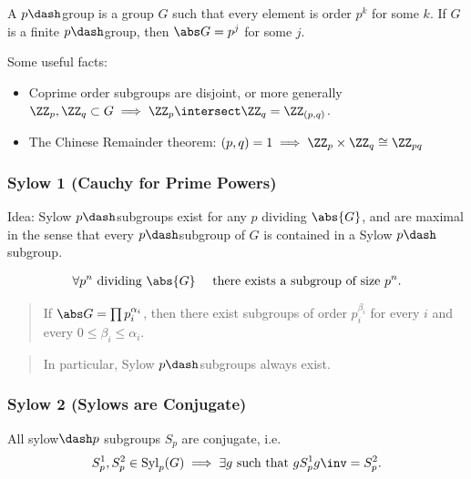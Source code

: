 \begin{definition}

A \(p\dash\)group is a group \(G\) such that every element is order
\(p^k\) for some \(k\). If \(G\) is a finite \(p\dash\)group, then
\(\abs G = p^j\) for some \(j\).

\end{definition}

Some useful facts:

\begin{itemize}
\item
  Coprime order subgroups are disjoint, or more generally
  \(\ZZ_p, \ZZ_q \subset G \implies \ZZ_p \intersect \ZZ_q = \ZZ_{(p,q)}\).
\item
  The Chinese Remainder theorem:
  \((p, q) = 1 \implies \ZZ_p \times \ZZ_q \cong \ZZ_{pq}\)
\end{itemize}

\hypertarget{sylow-1-cauchy-for-prime-powers}{%
\subsubsection{Sylow 1 (Cauchy for Prime
Powers)}\label{sylow-1-cauchy-for-prime-powers}}

Idea: Sylow \(p\dash\)subgroups exist for any \(p\) dividing
\(\abs{G}\), and are maximal in the sense that every \(p\dash\)subgroup
of \(G\) is contained in a Sylow \(p\dash\)subgroup.

\begin{align*}
\forall p^n \text{ dividing } \abs{G} \quad \text{ there exists a subgroup of size } p^n
.\end{align*}

\begin{quote}
If \(\abs G = \prod p_i^{\alpha_i}\), then there exist subgroups of
order \(p_i^{\beta_i}\) for every \(i\) and every
\(0 \leq \beta_i \leq \alpha_i\).
\end{quote}

\begin{quote}
In particular, Sylow \(p\dash\)subgroups always exist.
\end{quote}

\hypertarget{sylow-2-sylows-are-conjugate}{%
\subsubsection{Sylow 2 (Sylows are
Conjugate)}\label{sylow-2-sylows-are-conjugate}}

All sylow\(\dash p\) subgroups \(S_p\) are conjugate, i.e.
\begin{align*}
S_p^1, S_p^2 \in \mathrm{Syl}_p(G) \implies \exists g \text{ such that } g S_p^1g\inv = S_p^2
.\end{align*}

